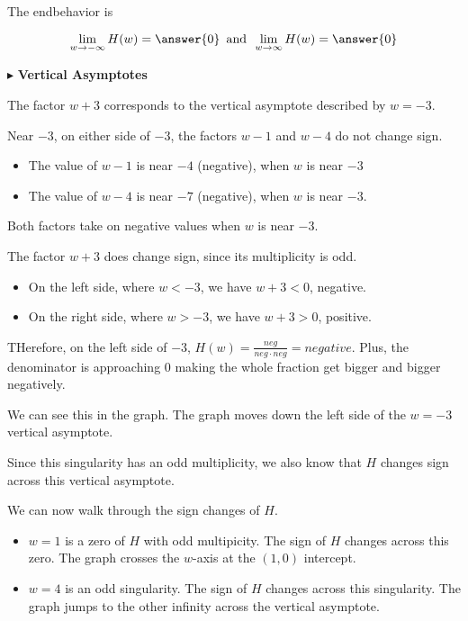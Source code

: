 \documentclass{ximera}
\begin{document}
\begin{example}
The endbehavior is



\[       \lim_{w \to -\infty} H(w) = \answer{0}   \, \text{ and } \,    \lim_{w \to \infty} H(w) = \answer{0}               \]





$\blacktriangleright$ \textbf{Vertical Asymptotes} 





The factor $w+3$ corresponds to the vertical asymptote described by $w = -3$.


Near $-3$, on either side of $-3$, the factors $w-1$ and $w-4$ do not change sign. 



\begin{itemize}
\item The value of $w-1$ is near $-4$ (negative), when $w$ is near $-3$
\item The value of $w-4$ is near $-7$ (negative), when $w$ is near $-3$.
\end{itemize}

Both factors take on negative values when $w$ is near $-3$.

The factor $w+3$ does change sign, since its multiplicity is odd.

\begin{itemize}
\item On the left side, where $w < -3$, we have $w+3<0$, negative.
\item On the right side, where $w > -3$, we have $w+3>0$, positive.
\end{itemize}


THerefore, on the left side of $-3$, $H(w) = \frac{neg}{neg \cdot neg} = negative$.  Plus, the denominator is approaching $0$ making the whole fraction get bigger and bigger negatively.

We can see this in the graph.  The graph moves down the left side of the $w=-3$ vertical asymptote.

Since this singularity has an odd multiplicity, we also know that $H$ changes sign across this vertical asymptote.


We can now walk through the sign changes of $H$.

\begin{itemize}
\item $w = 1$ is a zero of $H$ with odd multipicity.  The sign of $H$ changes across this zero. The graph crosses the $w$-axis at the $(1, 0)$ intercept.
\item $w = 4$ is an odd singularity. The sign of $H$ changes across this singularity.  The graph jumps to the other infinity across the vertical asymptote.
\end{itemize}




\end{example}
\end{document}
